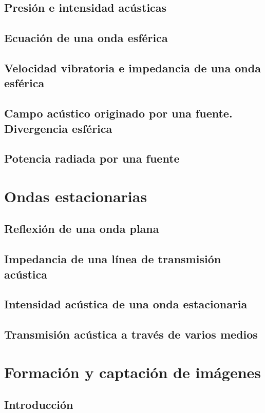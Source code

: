 \documentclass[a4paper]{book}
\begin{document}
\section{Presión e intensidad acústicas}
\section{Ecuación de una onda esférica}
\section[Velocidad vibratoria e impedancia de una onda esférica]{Velocidad vibratoria e impedancia de una onda\\ esférica}
\section{Campo acústico originado por una fuente. Divergencia esférica}
\section{Potencia radiada por una fuente}

\chapter{Ondas estacionarias}
\section{Reflexión de una onda plana}
\section{Impedancia de una línea de transmisión acústica}
\section{Intensidad acústica de una onda estacionaria}
\section{Transmisión acústica a través de varios medios}

\chapter{Formación y captación de imágenes}

\section{Introducción}
\end{document}

